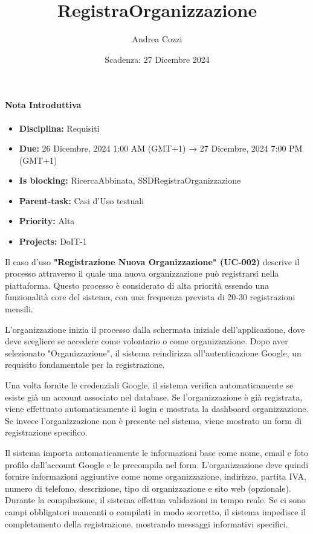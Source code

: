 \title{RegistraOrganizzazione}
\author{Andrea Cozzi}
\date{Scadenza: 27 Dicembre 2024}

\paragraph{Nota Introduttiva}
\begin{itemize}
  \item \textbf{Disciplina:} Requisiti
  \item \textbf{Due:} 26 Dicembre, 2024 1:00 AM (GMT+1) → 27 Dicembre, 2024 7:00 PM (GMT+1)
  \item \textbf{Is blocking:} RicercaAbbinata, SSDRegistraOrganizzazione
  \item \textbf{Parent-task:} Casi d'Uso testuali
  \item \textbf{Priority:} Alta
  \item \textbf{Projects:} DoIT-1
\end{itemize}

Il caso d'uso \textbf{"Registrazione Nuova Organizzazione" (UC-002)} descrive il processo attraverso il quale una nuova organizzazione può registrarsi nella piattaforma. Questo processo è considerato di alta priorità essendo una funzionalità core del sistema, con una frequenza prevista di 20-30 registrazioni mensili.

L'organizzazione inizia il processo dalla schermata iniziale dell'applicazione, dove deve scegliere se accedere come volontario o come organizzazione. Dopo aver selezionato "Organizzazione", il sistema reindirizza all'autenticazione Google, un requisito fondamentale per la registrazione.

Una volta fornite le credenziali Google, il sistema verifica automaticamente se esiste già un account associato nel database. Se l'organizzazione è già registrata, viene effettuato automaticamente il login e mostrata la dashboard organizzazione. Se invece l'organizzazione non è presente nel sistema, viene mostrato un form di registrazione specifico.

Il sistema importa automaticamente le informazioni base come nome, email e foto profilo dall'account Google e le precompila nel form. L'organizzazione deve quindi fornire informazioni aggiuntive come nome organizzazione, indirizzo, partita IVA, numero di telefono, descrizione, tipo di organizzazione e sito web (opzionale). Durante la compilazione, il sistema effettua validazioni in tempo reale. Se ci sono campi obbligatori mancanti o compilati in modo scorretto, il sistema impedisce il completamento della registrazione, mostrando messaggi informativi specifici.

